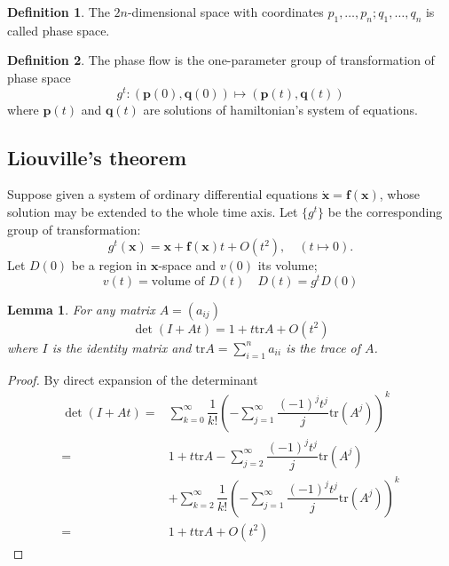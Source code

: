 \documentclass[conference]{IEEEtran}
\newtheorem{lemma}{Lemma}[section]
\theoremstyle{definition}
\newtheorem{definition}{Definition}[section]
\theoremstyle{remark}
\begin{document}
    \begin{definition}
        The $2n$-dimensional space with coordinates $p_1,\dots,p_n; q_1,\dots, q_n$ is called phase space.
    \end{definition}

    \begin{definition}
        The phase flow is the one-parameter group of transformation of phase space
        \begin{equation*}
            g^t:(\mathbf{p}(0), \mathbf{q}(0)) \mapsto (\mathbf{p}(t), \mathbf{q}(t))
        \end{equation*}
        where $\mathbf{p}(t)$ and $\mathbf{q}(t)$ are solutions of hamiltonian's system of equations.
    \end{definition}

    \subsection{Liouville's theorem}
    Suppose given a system of ordinary differential equations $\dot{\mathbf{x}} = \mathbf{f}(\mathbf{x})$, whose solution may be extended to the whole time axis. Let $\{g^t\}$ be the corresponding group of transformation:
    \begin{equation*}
        g^t(\mathbf{x}) = \mathbf{x} + \mathbf{f}(\mathbf{x}) t + O(t^2), \quad (t \mapsto 0).
    \end{equation*}
    Let $D(0)$ be a region in $\mathbf{x}$-space and $v(0)$ its volume;
    \begin{equation*}
        v(t) = \text{volume of } D(t) \quad D(t) = g^tD(0)
    \end{equation*}

    \begin{lemma}
        For any matrix $A = (a_{ij})$
        \begin{equation*}
            \det(I + At) = 1 + t \mathrm{tr} A + O(t^2)
        \end{equation*}
        where $I$ is the identity matrix and $\mathrm{tr} A = \sum_{i=1}^n a_{ii}$ is the trace of $A$.
    \end{lemma}

    \begin{proof}
        By direct expansion of the determinant
        \begin{align*}
            \det(I + At) =& \sum_{k=0}^\infty\dfrac{1}{k!}\left( -\sum_{j = 1}^\infty \dfrac{(-1)^j t^j}{j} \mathrm{tr}(A^j) \right)^k \\
            =& 1 + t \mathrm{tr} A -\sum_{j = 2}^\infty \dfrac{(-1)^j t^j}{j} \mathrm{tr}(A^j) \\
            & +\sum_{k=2}^\infty\dfrac{1}{k!}\left( -\sum_{j = 1}^\infty \dfrac{(-1)^j t^j}{j} \mathrm{tr}(A^j) \right)^k \\
            =& 1 + t \mathrm{tr} A + O(t^2)
        \end{align*}
    \end{proof}
\end{document}

